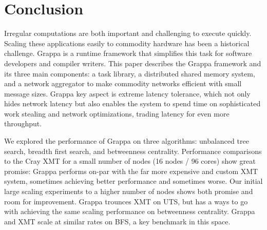 \section{Conclusion}

Irregular computations are both important and challenging to execute quickly.
Scaling these applications easily to commodity hardware has been a historical
challenge. Grappa is a runtime framework that simplifies this task for
software developers and compiler writers. This paper describes the Grappa
framework and its three main components: a task library, a distributed shared
memory system, and a network aggregator to make commodity networks efficient
with small message sizes. Grappa key aspect is extreme latency tolerance,
which not only hides network latency but also enables the system to spend time
on sophisticated work stealing and network optimizations, trading latency for
even more throughput.

We explored the performance of Grappa on three algorithms: unbalanced tree
search, breadth first search, and betweenness centrality. Performance
comparisons to the Cray XMT for a small number of nodes (16 nodes / 96 cores)
show great promise: Grappa performs on-par with the far more expensive and
custom XMT system, sometimes achieving better performance and sometimes worse.
Our initial large scaling experiments to a higher number of nodes shows both promise and room for improvement.  Grappa trounces XMT on UTS, but has a ways to go with achieving the same scaling performance on betweenness centrality.  Grappa and XMT scale at similar rates on BFS, a key benchmark in this space.
